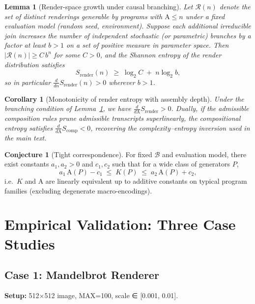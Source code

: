 \documentclass[12pt,a4paper]{article}
\theoremstyle{plain}
\newtheorem{lemma}[theorem]{Lemma}
\newtheorem{corollary}[theorem]{Corollary}
\theoremstyle{definition}
\newtheorem{conjecture}[theorem]{Conjecture}
\theoremstyle{remark}
\newcommand{\Sfield}{S}
\newcommand{\AI}{\mathrm{A}}
\begin{document}
\begin{lemma}[Render-space growth under causal branching]
\label{lem:render-growth}
Let ${\mathcal{R}}(n)$ denote the set of distinct renderings generable by programs with $\AI\!\le\! n$ under a fixed evaluation model (random seed, environment). Suppose each additional irreducible join increases the number of independent stochastic (or parametric) branches by a factor at least $b>1$ on a set of positive measure in parameter space. Then $|{\mathcal{R}}(n)| \ge C\,b^{n}$ for some $C>0$, and the Shannon entropy of the render distribution satisfies
\[
\Sfield_{\mathrm{render}}(n)\;\ge\; \log_2 C \;+\; n\log_2 b,
\]
so in particular $\frac{d}{dn}\Sfield_{\mathrm{render}}(n)>0$ wherever $b>1$.
\end{lemma}

\begin{corollary}[Monotonicity of render entropy with assembly depth]
\label{cor:entropy-monotonicity}
Under the branching condition of Lemma~\ref{lem:render-growth}, we have $\frac{d}{d\AI}\Sfield_{\mathrm{render}} > 0$. Dually, if the admissible composition rules prune admissible transcripts superlinearly, the \emph{compositional} entropy satisfies $\frac{d}{d\AI}\Sfield_{\mathrm{comp}}<0$, recovering the complexity–entropy inversion used in the main text.
\end{corollary}

\begin{conjecture}[Tight correspondence]
\label{conj:tight}
For fixed $\mathcal{B}$ and evaluation model, there exist constants $a_1,a_2>0$ and $c_1,c_2$ such that for a wide class of generators $P$,
\[
a_1\,\AI(P) - c_1 \;\le\; K(P) \;\le\; a_2\,\AI(P) + c_2,
\]
i.e.\ $K$ and $\AI$ are linearly equivalent up to additive constants on typical program families (excluding degenerate macro-encodings).
\end{conjecture}

\section{Empirical Validation: Three Case Studies}
\label{sec:empirical-validation}

\subsection{Case 1: Mandelbrot Renderer}
\textbf{Setup:} 512×512 image, MAX=100, scale ∈ [0.001, 0.01].
\end{document}
